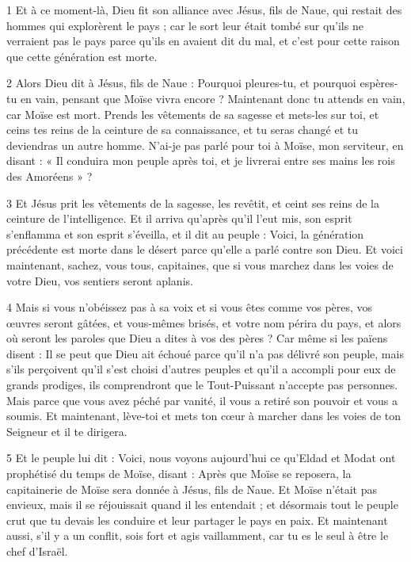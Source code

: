 
\par 1 Et à ce moment-là, Dieu fit son alliance avec Jésus, fils de Naue, qui restait des hommes qui explorèrent le pays ; car le sort leur était tombé sur qu'ils ne verraient pas le pays parce qu'ils en avaient dit du mal, et c'est pour cette raison que cette génération est morte.

\par 2 Alors Dieu dit à Jésus, fils de Naue : Pourquoi pleures-tu, et pourquoi espères-tu en vain, pensant que Moïse vivra encore ? Maintenant donc tu attends en vain, car Moïse est mort. Prends les vêtements de sa sagesse et mets-les sur toi, et ceins tes reins de la ceinture de sa connaissance, et tu seras changé et tu deviendras un autre homme. N'ai-je pas parlé pour toi à Moïse, mon serviteur, en disant : « Il conduira mon peuple après toi, et je livrerai entre ses mains les rois des Amoréens » ?

\par 3 Et Jésus prit les vêtements de la sagesse, les revêtit, et ceint ses reins de la ceinture de l'intelligence. Et il arriva qu'après qu'il l'eut mis, son esprit s'enflamma et son esprit s'éveilla, et il dit au peuple : Voici, la génération précédente est morte dans le désert parce qu'elle a parlé contre son Dieu. Et voici maintenant, sachez, vous tous, capitaines, que si vous marchez dans les voies de votre Dieu, vos sentiers seront aplanis.

\par 4 Mais si vous n'obéissez pas à sa voix et si vous êtes comme vos pères, vos œuvres seront gâtées, et vous-mêmes brisés, et votre nom périra du pays, et alors où seront les paroles que Dieu a dites à vos des pères ? Car même si les païens disent : Il se peut que Dieu ait échoué parce qu'il n'a pas délivré son peuple, mais s'ils perçoivent qu'il s'est choisi d'autres peuples et qu'il a accompli pour eux de grands prodiges, ils comprendront que le Tout-Puissant n'accepte pas personnes. Mais parce que vous avez péché par vanité, il vous a retiré son pouvoir et vous a soumis. Et maintenant, lève-toi et mets ton cœur à marcher dans les voies de ton Seigneur et il te dirigera.

\par 5 Et le peuple lui dit : Voici, nous voyons aujourd'hui ce qu'Eldad et Modat ont prophétisé du temps de Moïse, disant : Après que Moïse se reposera, la capitainerie de Moïse sera donnée à Jésus, fils de Naue. Et Moïse n'était pas envieux, mais il se réjouissait quand il les entendait ; et désormais tout le peuple crut que tu devais les conduire et leur partager le pays en paix. Et maintenant aussi, s'il y a un conflit, sois fort et agis vaillamment, car tu es le seul à être le chef d'Israël.


